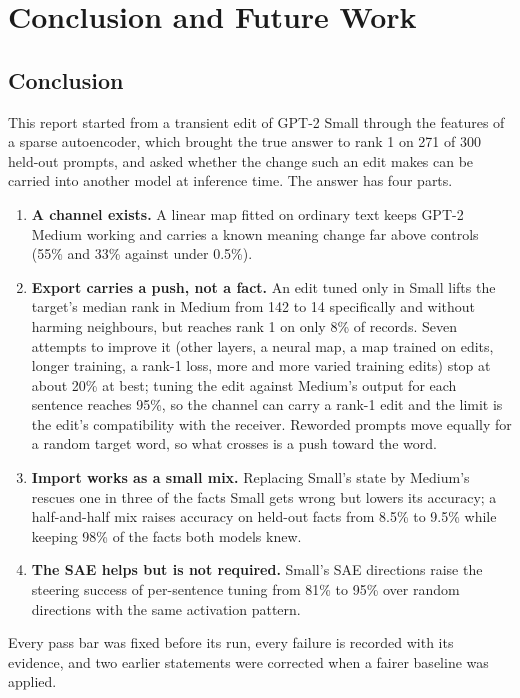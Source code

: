 \chapter{Conclusion and Future Work}\label{ch:conclusion}

\section{Conclusion}

This report started from a transient edit of GPT-2 Small through the features of a sparse autoencoder, which brought the true answer to rank 1 on 271 of 300 held-out prompts, and asked whether the change such an edit makes can be carried into another model at inference time. The answer has four parts.
\begin{enumerate}
  \item \textbf{A channel exists.} A linear map fitted on ordinary text keeps GPT-2 Medium working and carries a known meaning change far above controls (55\% and 33\% against under 0.5\%).
  \item \textbf{Export carries a push, not a fact.} An edit tuned only in Small lifts the target's median rank in Medium from 142 to 14 specifically and without harming neighbours, but reaches rank 1 on only 8\% of records. Seven attempts to improve it (other layers, a neural map, a map trained on edits, longer training, a rank-1 loss, more and more varied training edits) stop at about 20\% at best; tuning the edit against Medium's output for each sentence reaches 95\%, so the channel can carry a rank-1 edit and the limit is the edit's compatibility with the receiver. Reworded prompts move equally for a random target word, so what crosses is a push toward the word.
  \item \textbf{Import works as a small mix.} Replacing Small's state by Medium's rescues one in three of the facts Small gets wrong but lowers its accuracy; a half-and-half mix raises accuracy on held-out facts from 8.5\% to 9.5\% while keeping 98\% of the facts both models knew.
  \item \textbf{The SAE helps but is not required.} Small's SAE directions raise the steering success of per-sentence tuning from 81\% to 95\% over random directions with the same activation pattern.
\end{enumerate}
Every pass bar was fixed before its run, every failure is recorded with its evidence, and two earlier statements were corrected when a fairer baseline was applied.

